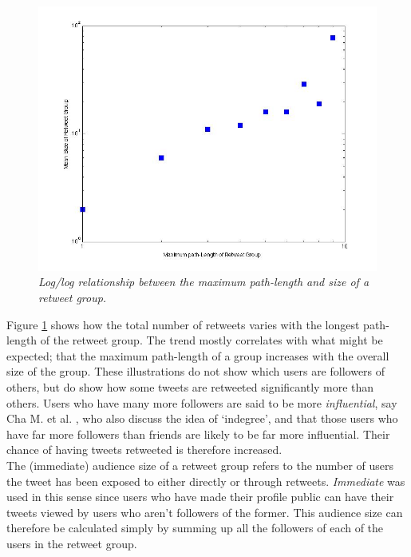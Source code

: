 \begin{figure}[h]
\includegraphics[scale=0.35]{3.Chapter1/Media/retweets-pathlength.jpg} 
\caption{\textit{Log/log relationship between the maximum path-length and size of a retweet group.}}
\label{fig:totalretweets-pathlength}
\end{figure}
Figure \ref{fig:totalretweets-pathlength} shows how the total number of retweets varies with the longest path-length of the retweet group. The trend mostly correlates with what might be expected; that the maximum path-length of a group increases with the overall size of the group. These illustrations do not show which users are followers of others, but do show how some tweets are retweeted significantly more than others. Users who have many more followers are said to be more \textit{influential}, say Cha M. et al. \cite{cha10}, who also discuss the idea of `indegree', and that those users who have far more followers than friends are likely to be far more influential. Their chance of having tweets retweeted is therefore increased.\\
The (immediate) audience size of a retweet group refers to the number of users the tweet has been exposed to either directly or through retweets. \textit{Immediate} was used in this sense since users who have made their profile public can have their tweets viewed by users who aren't followers of the former. This audience size can therefore be calculated simply by summing up all the followers of each of the users in the retweet group.\\
